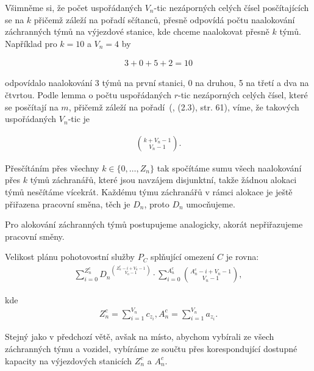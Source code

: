 \begin{dukaz}
  Všimněme si, že počet uspořádaných $V_n$-tic nezáporných celých čísel posčítajících se na $k$
  přičemž záleží na pořadí sčítanců, přesně odpovídá počtu naalokování záchranných týmů na výjezdové stanice, kde chceme naalokovat přesně $k$ týmů.
  Například pro $k = 10$ a $V_n = 4$ by

  \begin{align*}
    3 + 0 + 5 + 2 = 10
  \end{align*}

  odpovídalo naalokování 3 týmů na první stanici, 0 na druhou, 5 na třetí a dva na čtvrtou.
  Podle lemma o počtu uspořádaných $r$-tic nezáporných celých čísel, které se posčítají na $m$, přičemž záleží na pořadí~(\citet{Diskretka}, (2.3), str. 61),
  víme, že takových uspořádaných $V_n$-tic je

  \begin{align}
    \binom{k + V_n - 1}{V_n - 1}.
  \end{align}

  Přesčítáním přes všechny $k \in \{ 0, \dots, Z_n \}$ tak spočítáme sumu všech naalokování přes $k$ týmů záchranářů, které jsou navzájem disjunktní, takže žádnou alokaci týmů nesčítáme vícekrát.
  Každému týmu záchranářů v rámci alokace je ještě přiřazena pracovní směna, těch je $D_n$, proto $D_n$ umocňujeme. 

  Pro alokování záchranných týmů postupujeme analogicky, akorát nepřiřazujeme pracovní směny.
\end{dukaz}

\begin{veta}
  Velikost plánu pohotovostní služby $P_C$ splňující omezení $C$ je rovna:
  \begin{align*}
    \sum_{i=0}^{Z^c_n}{{D_n}^{\binom{Z^c_n - i + V_n - 1}{V_n - 1}}} \cdot \sum_{i = 0}^{A^c_n}\binom{A^c_n - i + V_n - 1}{V_n - 1},
  \end{align*}

  kde
  \begin{align*}
    Z^c_n = \sum_{i=1}^{V_n} c_{z_{i}}, A^c_n = \sum_{i=1}^{V_n} a_{z_{i}}.
  \end{align*}
\end{veta}

\begin{dukaz}
  Stejný jako v předchozí větě, avšak na místo, abychom vybírali ze všech záchranných týmu a vozidel,
  vybíráme ze součtu přes korespondující dostupné kapacity na výjezdových stanicích $Z^c_n$ a $A^c_n$.
\end{dukaz}


